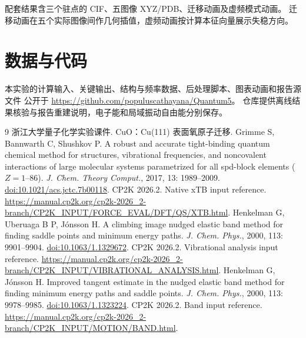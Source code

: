 \documentclass[UTF8,a4paper,12pt,fontset=fandol]{ctexart}
\begin{document}
配套结果含三个驻点的 CIF、五图像 XYZ/PDB、迁移动画及虚频模式动画。
迁移动画在五个实际图像间作几何插值，虚频动画按计算本征向量展示失稳方向。

\section*{数据与代码}
本实验的计算输入、关键输出、结构与频率数据、后处理脚本、图表动画和报告源文件
公开于 \url{https://github.com/populuscathayana/Quantum5}。
仓库提供离线结果核验与报告重建说明，电子能和局域振动自由能分别保存。

\begin{thebibliography}{9}
 浙江大学量子化学实验课件. CuO：Cu(111) 表面氧原子迁移.
 Grimme S, Bannwarth C, Shushkov P. A robust and accurate tight-binding quantum chemical method
for structures, vibrational frequencies, and noncovalent interactions of large molecular systems
parametrized for all spd-block elements ($Z=1$--86). \textit{J. Chem. Theory Comput.}, 2017, 13: 1989--2009.
\href{https://doi.org/10.1021/acs.jctc.7b00118}{doi:10.1021/acs.jctc.7b00118}.
 CP2K 2026.2. Native xTB input reference.
\url{https://manual.cp2k.org/cp2k-2026_2-branch/CP2K_INPUT/FORCE_EVAL/DFT/QS/XTB.html}.
 Henkelman G, Uberuaga B P, Jónsson H. A climbing image nudged elastic band method for
finding saddle points and minimum energy paths. \textit{J. Chem. Phys.}, 2000, 113: 9901--9904.
\href{https://doi.org/10.1063/1.1329672}{doi:10.1063/1.1329672}.
 CP2K 2026.2. Vibrational analysis input reference.
\url{https://manual.cp2k.org/cp2k-2026_2-branch/CP2K_INPUT/VIBRATIONAL_ANALYSIS.html}.
 Henkelman G, Jónsson H. Improved tangent estimate in the nudged elastic band method for finding
minimum energy paths and saddle points. \textit{J. Chem. Phys.}, 2000, 113: 9978--9985.
\href{https://doi.org/10.1063/1.1323224}{doi:10.1063/1.1323224}.
 CP2K 2026.2. Band input reference.
\url{https://manual.cp2k.org/cp2k-2026_2-branch/CP2K_INPUT/MOTION/BAND.html}.
\end{thebibliography}
\end{document}

